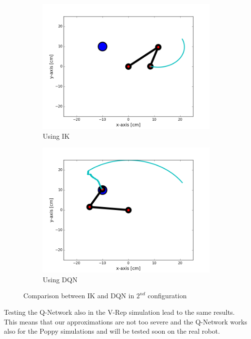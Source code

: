 \documentclass{article}
\begin{document}
\begin{figure}[H]
\begin{subfigure}{.5\textwidth}
  \centering
  \includegraphics[width=.8\linewidth]{reportpics/scene2ik.png}
  \caption{Using IK}
  \label{fig:scenario2_ik}
\end{subfigure}%
\begin{subfigure}{.5\textwidth}
  \centering
  \includegraphics[width=.8\linewidth]{reportpics/scene2dqn.png}
  \caption{Using DQN}
  \label{fig:scenario2_dqn}
\end{subfigure}
\caption{Comparison between IK and DQN in $2^{nd}$ configuration}
\label{fig:scenario2}
\end{figure}

Testing the Q-Network also in the V-Rep simulation lead to the same results. This means that our approximations are not too severe and the Q-Network works also for the Poppy simulations and will be tested soon on the real robot.

\vspace{\baselineskip}
\end{document}
